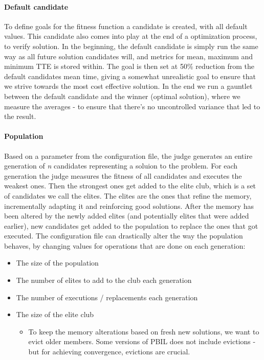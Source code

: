 \documentclass[a4paper,english]{report}
\begin{document}
		\paragraph{Default candidate}
		To define goals for the fitness function a candidate is created, with all default values. This candidate also comes into play at the end of a optimization process, to verify solution. In the beginning, the default candidate is simply run the same way as all future solution candidates will, and metrics for mean, maximum and minimum TTE is stored within. The goal is then set at 50\% reduction from the default candidates mean time, giving a somewhat unrealistic goal to ensure that we strive towards the most cost effective solution. In the end we run a gauntlet between the default candidate and the winner (optimal solution), where we measure the averages - to ensure that there's no uncontrolled variance that led to the result.
		\paragraph{Population}
		Based on a parameter from the configuration file, the judge generates an entire generation of \textit{n} candidates representing a soluion to the problem. For each generation the judge measures the fitness of all candidates and executes the weakest ones. Then the strongest ones get added to the elite club, which is a set of candidates we call the elites. The elites are the ones that refine the memory, incrementally adapting it and reinforcing good solutions. After the memory has been altered by the newly added elites (and potentially elites that were added earlier), new candidates get added to the population to replace the ones that got executed. The configuration file can drastically alter the way the population behaves, by changing values for operations that are done on each generation:
		\begin{itemize}
			\item The size of the population
			\item The number of elites to add to the club each generation
			\item The number of executions / replacements each generation
			\item The size of the elite club
			   \begin{itemize}
				\item To keep the memory alterations based on fresh new solutions, we want to evict older members. Some versions of PBIL does not include evictions - but for achieving convergence, evictions are crucial.
				\end{itemize}
		\end{itemize}
		\clearpage
\end{document}
